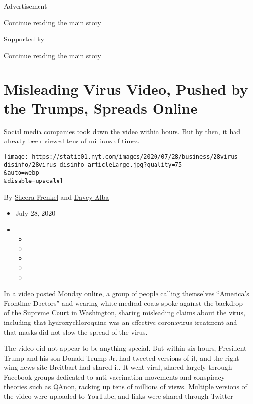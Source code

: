 Advertisement

\protect\hyperlink{after-top}{Continue reading the main story}

Supported by

\protect\hyperlink{after-sponsor}{Continue reading the main story}

\hypertarget{misleading-virus-video-pushed-by-the-trumps-spreads-online}{%
\section{Misleading Virus Video, Pushed by the Trumps, Spreads
Online}\label{misleading-virus-video-pushed-by-the-trumps-spreads-online}}

Social media companies took down the video within hours. But by then, it
had already been viewed tens of millions of times.

\texttt{[image: https://static01.nyt.com/images/2020/07/28/business/28virus-disinfo/28virus-disinfo-articleLarge.jpg?quality=75\\\&auto=webp\\\&disable=upscale]}

By \href{https://www.nytimes.com/by/sheera-frenkel}{Sheera Frenkel} and
\href{https://www.nytimes.com/by/davey-alba}{Davey Alba}

\begin{itemize}
\item
  July 28, 2020
\item
  \begin{itemize}
  \item
  \item
  \item
  \item
  \item
  \end{itemize}
\end{itemize}

In a video posted Monday online, a group of people calling themselves
``America's Frontline Doctors'' and wearing white medical coats spoke
against the backdrop of the Supreme Court in Washington, sharing
misleading claims about the virus, including that hydroxychloroquine was
an effective coronavirus treatment and that masks did not slow the
spread of the virus.

The video did not appear to be anything special. But within six hours,
President Trump and his son Donald Trump Jr. had tweeted versions of it,
and the right-wing news site Breitbart had shared it. It went viral,
shared largely through Facebook groups dedicated to anti-vaccination
movements and conspiracy theories such as QAnon, racking up tens of
millions of views. Multiple versions of the video were uploaded to
YouTube, and links were shared through Twitter.

